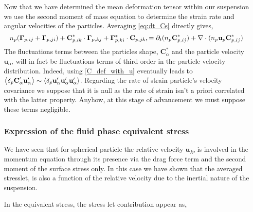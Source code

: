 Now that we have determined the mean deformation tensor within our suspension we use the second moment of mass equation to determine the strain rate and angular velocities of the particles. 
Averaging \ref{eq:dt_Cs} directly gives, 
\begin{equation}
    n_p 
    (\bm\Gamma_{p,ij}
    +  \bm\Gamma_{p,ji})
    + \textbf{C}_{p,ik}^* \cdot \bm\Gamma_{p,kj}
    + \bm\Gamma_{p,ki}^* \cdot \textbf{C}_{p,jk},
    = 
    \partial_t (n_p \textbf{C}_{p,ij}^*)
    + \mathbf{\nabla}\cdot(n_p \textbf{u}_p \textbf{C}_{p,ij}^*)
\end{equation}
The fluctuations terms between the particles shape, $\textbf{C}_\alpha^*$ and the particle velocity $\textbf{u}_\alpha$, will in fact be fluctuations terms of third order in the particle velocity distribution.
Indeed, using \ref{C_def_with_u} eventually leads to $\left<\delta_{p} \textbf{C}'_\alpha \textbf{u}_\alpha'\right> \sim \left<\delta_{p} \textbf{u}_\alpha'\textbf{u}_\alpha' \textbf{u}_\alpha'\right>$. 
Regarding the rate of strain particle's velocity covariance we suppose that it is null as the rate of strain isn't a priori correlated with the latter property. 
Anyhow, at this stage of advancement we must suppose these terms negligible. 

\subsubsection*{Expression of the fluid phase equivalent stress}

We have seen that for spherical particle the relative velocity $\textbf{u}_{fp}$ is involved in the momentum equation through its presence via the drag force term and the second moment of the surface stress only.  
In this case we have shown that the averaged stresslet, is also a function of the relative velocity due to the inertial nature of the suspension. 

In the equivalent stress, the stress let contribution appear as, 


